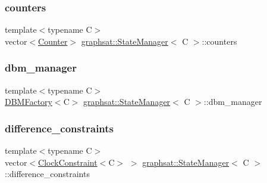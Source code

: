 \subsubsection{\texorpdfstring{counters}{counters}}
{\footnotesize\ttfamily template$<$typename C$>$ \\
vector$<$\mbox{\hyperlink{classgraphsat_1_1_counter}{Counter}}$>$ \mbox{\hyperlink{classgraphsat_1_1_state_manager}{graphsat\+::\+State\+Manager}}$<$ C $>$\+::counters\hspace{0.3cm}{\ttfamily [private]}}

\mbox{\label{classgraphsat_1_1_state_manager_a0d038a5e508b0ac118f42c09e59c82bc}} 
\subsubsection{\texorpdfstring{dbm\_manager}{dbm\_manager}}
{\footnotesize\ttfamily template$<$typename C$>$ \\
\mbox{\hyperlink{classgraphsat_1_1_d_b_m_factory}{D\+B\+M\+Factory}}$<$C$>$ \mbox{\hyperlink{classgraphsat_1_1_state_manager}{graphsat\+::\+State\+Manager}}$<$ C $>$\+::dbm\+\_\+manager\hspace{0.3cm}{\ttfamily [private]}}

\mbox{\label{classgraphsat_1_1_state_manager_a87a7f4aba15eea34c673d605e4f61582}} 
\subsubsection{\texorpdfstring{difference\_constraints}{difference\_constraints}}
{\footnotesize\ttfamily template$<$typename C$>$ \\
vector$<$\mbox{\hyperlink{classgraphsat_1_1_clock_constraint}{Clock\+Constraint}}$<$C$>$ $>$ \mbox{\hyperlink{classgraphsat_1_1_state_manager}{graphsat\+::\+State\+Manager}}$<$ C $>$\+::difference\+\_\+constraints\hspace{0.3cm}{\ttfamily [private]}}

